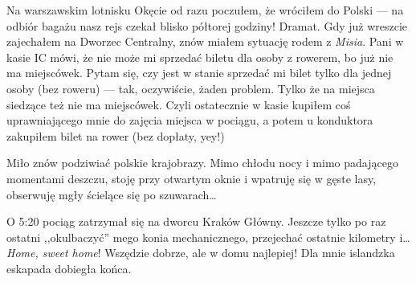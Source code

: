 Na warszawskim lotnisku Okęcie od razu poczułem, że wróciłem do Polski --- na odbiór bagażu nasz rejs czekał blisko półtorej godziny! Dramat. Gdy już wreszcie zajechałem na Dworzec Centralny, znów miałem sytuację rodem z \emph{Misia}. Pani w kasie IC mówi, że nie może mi sprzedać biletu dla osoby z rowerem, bo już nie ma miejscówek. Pytam się, czy jest w stanie sprzedać mi bilet tylko dla jednej osoby (bez roweru) --- tak, oczywiście, żaden problem. Tylko że na miejsca siedzące też nie ma miejscówek. Czyli ostatecznie w kasie kupiłem coś uprawniającego mnie do zajęcia miejsca w pociągu, a potem u konduktora zakupiłem bilet na rower (bez dopłaty, yey!)

Miło znów podziwiać polskie krajobrazy. Mimo chłodu nocy i mimo padającego momentami deszczu, stoję przy otwartym oknie i wpatruję się w gęste lasy, obserwuję mgły ścielące się po szuwarach…

O 5:20 pociąg zatrzymał się na dworcu Kraków Główny. Jeszcze tylko po raz ostatni ,,okulbaczyć'' mego konia mechanicznego, przejechać ostatnie kilometry i… \emph{Home, sweet home}! Wszędzie dobrze, ale w domu najlepiej! Dla mnie islandzka eskapada dobiegła końca.

